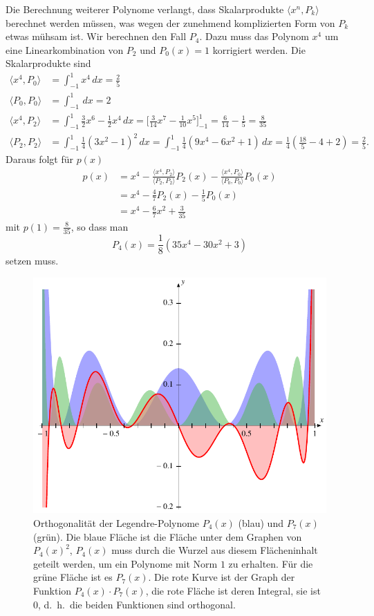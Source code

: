 Die Berechnung weiterer Polynome verlangt, dass Skalarprodukte
$\langle x^n,P_k\rangle$ berechnet werden müssen, was wegen
der zunehmend komplizierten Form von $P_k$ etwas mühsam ist.
Wir berechnen den Fall $P_4$.
Dazu muss das Polynom $x^4$ um eine Linearkombination von
$P_2$ und $P_0(x)=1$ korrigiert werden.
Die Skalarprodukte sind
\begin{align*}
\langle x^4, P_0\rangle
&=
\int_{-1}^1 x^4\,dx = \frac25
\\
\langle P_0,P_0\rangle
&=
\int_{-1}^1 \,dx = 2
\\
\langle x^4,P_2\rangle
&=
\int_{-1}^1 \frac32x^6-\frac12 x^4\,dx
=
\biggl[\frac{3}{14}x^7-\frac{1}{10}x^5\biggr]_{-1}^1
=
\frac6{14}-\frac15
=
\frac8{35}
\\
\langle P_2,P_2\rangle
&=
\int_{-1}^1 \frac14(3x^2-1)^2\,dx
=
\int_{-1}^1 \frac14(9x^4-6x^2+1)\,dx
=
\frac14(\frac{18}{5}-4+2)
=\frac25.
\end{align*}
Daraus folgt für $p(x)$
\begin{align*}
p(x)
&=
x^4
-
\frac{\langle x^4,P_2\rangle}{\langle P_2,P_2\rangle}P_2(x)
-
\frac{\langle x^4,P_0\rangle}{\langle P_0,P_0\rangle}P_0(x)
\\
&=
x^4
-\frac47 P_2(x) - \frac15 P_0(x)
\\
&=
x^4 - \frac{6}{7}x^2 + \frac{3}{35}
\end{align*}
mit $p(1)=\frac{8}{35}$, so dass man
\[
P_4(x) =
\frac18(35x^4-30x^2+3)
\]
setzen muss.

\begin{figure}
\centering
\includegraphics{chapters/060-integral/images/orthogonal.pdf}
\caption{Orthogonalität der Legendre-Polynome $P_4(x)$ ({\color{blue}blau})
und $P_7(x)$ ({\color{darkgreen}grün}).
Die blaue Fläche ist die Fläche unter dem Graphen 
von $P_4(x)^2$, $P_4(x)$ muss durch die Wurzel aus diesem Flächeninhalt
geteilt werden, um ein Polynome mit Norm $1$ zu erhalten.
Für die grüne Fläche ist es $P_7(x)$.
Die rote Kurve ist der Graph der Funktion $P_4(x)\cdot P_7(x)$,
die rote Fläche ist deren Integral, sie ist $0$, d.~h.~die beiden
Funktionen sind orthogonal.
\label{buch:integral:orthogonal:legendreortho}}
\end{figure}

